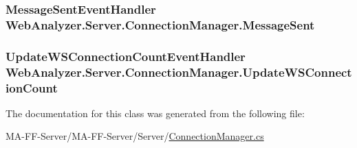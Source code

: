 \subsubsection[{Message\+Sent}]{\setlength{\rightskip}{0pt plus 5cm}Message\+Sent\+Event\+Handler Web\+Analyzer.\+Server.\+Connection\+Manager.\+Message\+Sent}\label{class_web_analyzer_1_1_server_1_1_connection_manager_a2eb5de18882e69a65b4b7ce3ee458af1}
\hypertarget{class_web_analyzer_1_1_server_1_1_connection_manager_ab583440105517709081698d731b2bdcd}{}
\subsubsection[{Update\+W\+S\+Connection\+Count}]{\setlength{\rightskip}{0pt plus 5cm}Update\+W\+S\+Connection\+Count\+Event\+Handler Web\+Analyzer.\+Server.\+Connection\+Manager.\+Update\+W\+S\+Connection\+Count}\label{class_web_analyzer_1_1_server_1_1_connection_manager_ab583440105517709081698d731b2bdcd}


The documentation for this class was generated from the following file\+:\begin{DoxyCompactItemize}
\item 
M\+A-\/\+F\+F-\/\+Server/\+M\+A-\/\+F\+F-\/\+Server/\+Server/\hyperlink{_connection_manager_8cs}{Connection\+Manager.\+cs}\end{DoxyCompactItemize}
